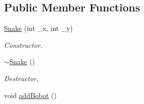 \subsection*{Public Member Functions}
\begin{DoxyCompactItemize}
\item 
\hyperlink{classSnake_a94d42d8a098d807f5ab45d1074269b08}{Snake} (int \-\_\-x, int \-\_\-y)
\begin{DoxyCompactList}\small\item\em Constructor. \end{DoxyCompactList}\item 
\hypertarget{classSnake_a941fbaad96ee33ca3a7c30c28ca44ef8}{\hyperlink{classSnake_a941fbaad96ee33ca3a7c30c28ca44ef8}{$\sim$\-Snake} ()}\label{classSnake_a941fbaad96ee33ca3a7c30c28ca44ef8}

\begin{DoxyCompactList}\small\item\em Destructor. \end{DoxyCompactList}\item 
\hypertarget{classSnake_a145debb3583b794ea74a26fa0b94b542}{void \hyperlink{classSnake_a145debb3583b794ea74a26fa0b94b542}{add\-Bobot} ()}\label{classSnake_a145debb3583b794ea74a26fa0b94b542}


\end{DoxyCompactItemize}
